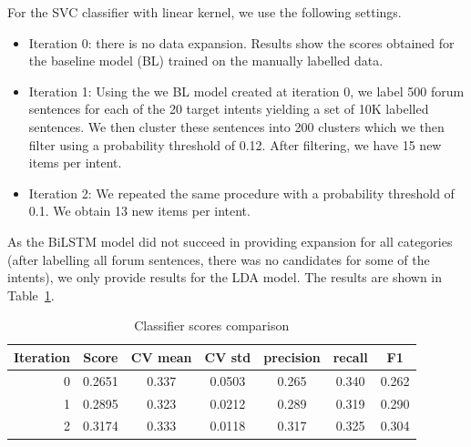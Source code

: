 \documentclass[11pt]{article}
\begin{document}
For the SVC classifier with linear kernel, we use the following settings.

\begin{itemize}
\item Iteration 0: there is no data expansion. Results show the scores
  obtained for the baseline model (BL) trained on the manually labelled
  data.
\item Iteration 1: Using the we BL model created at iteration 0, we
  label 500 forum sentences for each of the 20 target intents
  yielding a set of 10K labelled sentences. We then cluster these
  sentences into 200 clusters which we then filter using a probability
  threshold of 0.12. After filtering, we have 15 new items per intent.
\item Iteration 2: We repeated the same procedure with a probability
  threshold of 0.1. We obtain 13 new items per intent.
\end{itemize}

As the BiLSTM model did not succeed in providing expansion for all
categories (after labelling all forum sentences, there was no
candidates for some of the intents), we only provide results for the
LDA model. The results are shown in Table~\ref{tab:lin_gen_scores}.



\begin{table}[htb]
\begin{center}
\begin{tabular}{ |r|c|c|c|c|c|c| }
\hline
Iteration 	& Score  & CV mean & CV std & precision & recall & F1 \\ \hline
0			& 0.2651 & 0.337   & 0.0503 & 0.265 	& 0.340  & 0.262 \\ \hline
1			& 0.2895 & 0.323   & 0.0212 & 0.289 	& 0.319  & 0.290 \\ \hline
2 			& 0.3174 & 0.333   & 0.0118 & 0.317 	& 0.325  & 0.304 \\ \hline
\end{tabular}
\caption{Classifier scores comparison}
\label{tab:lin_gen_scores}
\end{center}
\end{table}
\FloatBarrier
\end{document}
